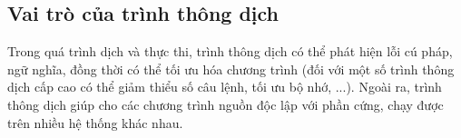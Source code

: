 \subsection{Vai trò của trình thông dịch}
Trong quá trình dịch và thực thi, trình thông dịch có thể phát hiện lỗi cú pháp, ngữ nghĩa, đồng thời có thể tối ưu hóa chương trình (đối với một số trình thông dịch cấp cao có thể giảm thiểu số câu lệnh, tối ưu bộ nhớ, ...). Ngoài ra, trình thông dịch giúp cho các chương trình nguồn độc lập với phần cứng, chạy được trên nhiều hệ thống khác nhau.